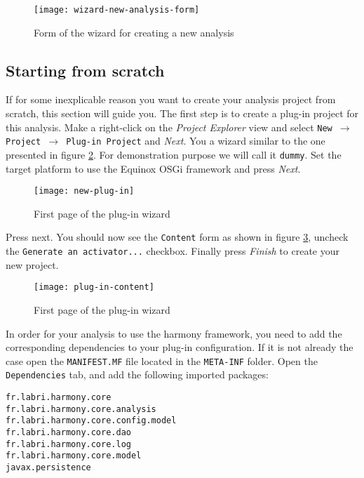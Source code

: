 	\begin{figure}[H]
		\centering
		\texttt{[image: wizard-new-analysis-form]}
		\caption{Form of the wizard for creating a new analysis}
		\label{fig:wizard-new-analysis-form}
	\end{figure}


\subsection{Starting from scratch}\label{newAnalysis:fromScratch}

If for some inexplicable reason you want to create your analysis project from scratch, this section will guide you. The first step is to create a plug-in project for this analysis. Make a right-click on the \emph{Project Explorer} view and select \texttt{New $\rightarrow$ Project $\rightarrow$ Plug-in Project} and \emph{Next}. You a wizard similar to the one presented in figure \ref{fig:new-plug-in}. For demonstration purpose we will call it \texttt{dummy}. Set the target platform to use the Equinox OSGi framework and press \emph{Next}.

	\begin{figure}[H]
		\centering
		\texttt{[image: new-plug-in]}
		\caption{First page of the plug-in wizard}
		\label{fig:new-plug-in}
	\end{figure}
	
Press next. You should now see the \texttt{Content} form as shown in figure \ref{fig:plug-in-content}, uncheck the \texttt{Generate an activator...} checkbox. Finally press \emph{Finish} to create your new project.

	\begin{figure}[H]
		\centering
		\texttt{[image: plug-in-content]}
		\caption{First page of the plug-in wizard}
		\label{fig:plug-in-content}
	\end{figure}

In order for your analysis to use the harmony framework, you need to add the corresponding dependencies to your plug-in configuration. If it is not already the case open the \texttt{MANIFEST.MF} file located in the \texttt{META-INF} folder. Open the \texttt{Dependencies} tab, and add the following imported packages:

\begin{lstlisting}
fr.labri.harmony.core
fr.labri.harmony.core.analysis
fr.labri.harmony.core.config.model
fr.labri.harmony.core.dao
fr.labri.harmony.core.log
fr.labri.harmony.core.model
javax.persistence
\end{lstlisting}

